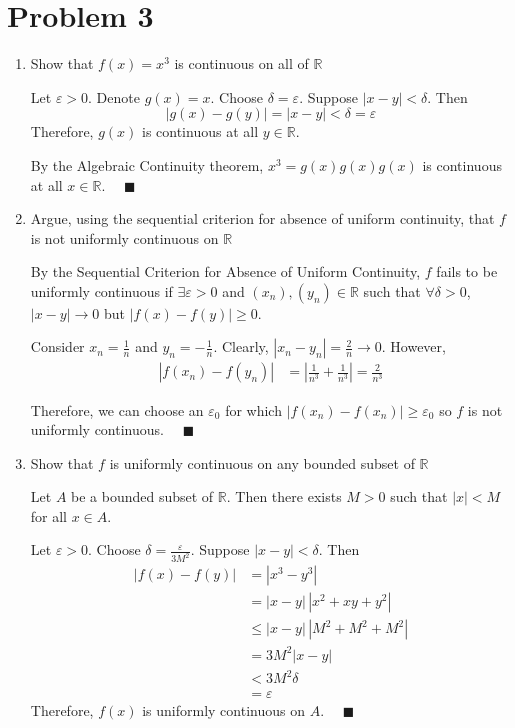 \documentclass[12pt]{article}
\newcommand{\R}{\mathbb{R}}
\newcommand{\qed}{\quad \blacksquare}
\newcommand{\abs}[1]{\left\vert #1 \right\vert}
\newcommand{\ep}{\varepsilon}
\begin{document}
\section*{Problem 3}
\begin{enumerate}
	\item Show that $f(x)=x^3$ is continuous on all of $\mathbb{R}$
	
        \color{blue}
            Let $\ep > 0$. Denote $g(x) = x$. Choose $\delta = \ep$. Suppose $\abs{x - y} < \delta$. Then
            \[\abs{g(x) - g(y)} = \abs{x - y} < \delta = \ep\]
            Therefore, $g(x)$ is continuous at all $y \in \R$.

            By the Algebraic Continuity theorem, $x^3 = g(x)g(x)g(x)$ is continuous at all $x \in \R$. $\qed$
        \color{black}

	\item Argue, using the sequential criterion for absence of uniform continuity, that $f$ is not uniformly continuous on $\mathbb{R}$
	
        \color{blue}
            By the Sequential Criterion for Absence of Uniform Continuity, $f$ fails to be uniformly continuous if $\exists \ep > 0$ and $(x_n), (y_n) \in \R$ such that $\forall \delta > 0$, $\abs{x - y} \to 0$ but $\abs{f(x) - f(y)} \geq 0$.
        
            Consider $x_n = \frac{1}{n}$ and $y_n =-\frac{1}{n}$. Clearly, $\abs{x_n - y_n} = \frac{2}{n} \to 0$. However, 
            \begin{align*}
                \abs{f(x_n) - f(y_n)} &= \abs{\frac{1}{n^3} + \frac{1}{n^3}} = \frac{2}{n^3}
            \end{align*}

            Therefore, we can choose an $\ep_0$ for which $\abs{f(x_n)- f(x_n)} \geq \ep_0$ so $f$ is not uniformly continuous. $\qed$
        \color{black}

	\item Show that $f$ is uniformly continuous on any bounded subset of $\mathbb{R}$
            
        \color{blue}
            Let $A$ be a bounded subset of $\R$. Then there exists $M > 0$ such that $\abs{x} < M$ for all $x \in A$. 

            Let $\ep > 0$. Choose $\delta = \frac{\ep}{3M^2}$. Suppose $\abs{x - y} < \delta$. Then
            \begin{align*}
                \abs{f(x) - f(y)} &= \abs{x^3 - y^3}\\ 
                    &= \abs{x - y}\,\abs{x^2 + xy + y^2}\\ 
                    &\leq \abs{x - y}\,\abs{M^2 + M^2 + M^2}\\ 
                    &= 3M^2\abs{x - y}\\ 
                    &< 3M^2\delta\\
                    &= \ep
            \end{align*}
            Therefore, $f(x)$ is uniformly continuous on $A$. $\qed$
        \color{black}

\end{enumerate}
\end{document}
